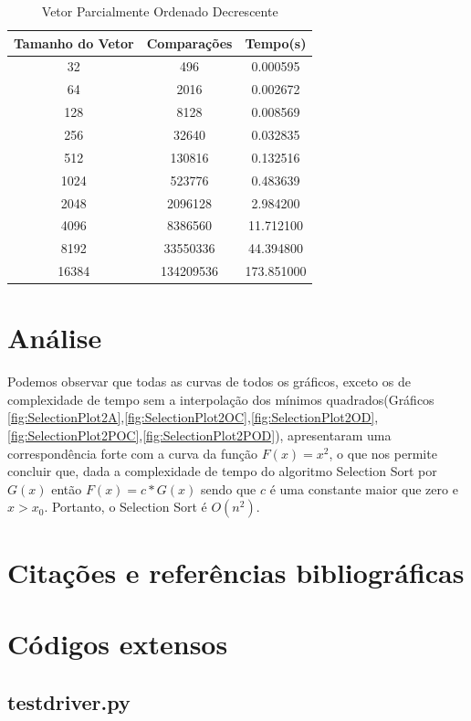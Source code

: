 \documentclass[12pt,a4paper,twoside]{report}
\begin{document}
\begin{table}[h]
  \centering
  \caption{Vetor Parcialmente Ordenado Decrescente \label{tab:pod}}
  \begin{tabular}{ccc} \\\hline
  \textbf{Tamanho do Vetor} & \textbf{Comparações} & \textbf{Tempo(s)} \\\hline
  32                        & 496                  & 0.000595          \\\hline
  64                        & 2016                 & 0.002672          \\\hline
  128                       & 8128                 & 0.008569          \\\hline
  256                       & 32640                & 0.032835          \\\hline
  512                       & 130816               & 0.132516          \\\hline
  1024                      & 523776               & 0.483639          \\\hline
  2048                      & 2096128              & 2.984200          \\\hline
  4096                      & 8386560              & 11.712100         \\\hline
  8192                      & 33550336             & 44.394800        \\\hline
  16384                     & 134209536            & 173.851000        \\\hline
  \end{tabular}
\end{table}


\chapter{Análise}

Podemos observar que todas as curvas de todos os gráficos, exceto os de complexidade de tempo sem a interpolação dos mínimos quadrados(Gráficos \ref{fig:SelectionPlot2A},\ref{fig:SelectionPlot2OC},\ref{fig:SelectionPlot2OD},\ref{fig:SelectionPlot2POC},\ref{fig:SelectionPlot2POD}), apresentaram uma correspondência forte com a curva da função $F(x) = x^2$, o que nos permite concluir que, dada a complexidade de tempo do algoritmo Selection Sort por $G(x)$ então $F(x) = c * G(x)$ sendo que $c$ é uma constante maior que zero e $x > x_0$. Portanto, o Selection Sort é $O(n^2)$.

\chapter{Citações e referências bibliográficas}








\clearpage
{}
\appendix

\chapter{Códigos extensos \label{ap:testdriver}}
\section{testdriver.py}

\end{document}
